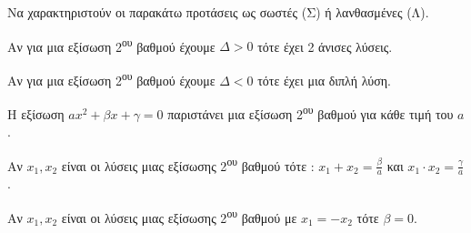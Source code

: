 Να χαρακτηριστούν οι παρακάτω προτάσεις ως σωστές (Σ) ή λανθασμένες (Λ).
\begin{alist}[leftmargin=4mm]
\item Αν για μια εξίσωση 2\textsuperscript{ου} βαθμού έχουμε $ \varDelta>0 $ τότε έχει 2 άνισες λύσεις.
\item Αν για μια εξίσωση 2\textsuperscript{ου} βαθμού έχουμε $ \varDelta<0 $ τότε έχει μια διπλή λύση.
\item Η εξίσωση $ ax^2+\beta x+\gamma=0 $ παριστάνει μια εξίσωση 2\textsuperscript{ου} βαθμού για κάθε τιμή του $ a $.
\item Αν $ x_1, x_2 $ είναι οι λύσεις μιας εξίσωσης 2\textsuperscript{ου} βαθμού τότε : $ x_1+x_2=\frac{\beta}{a} $ και $ x_1\cdot x_2=\frac{\gamma}{a} $.
\item Αν $ x_1, x_2 $ είναι οι λύσεις μιας εξίσωσης 2\textsuperscript{ου} βαθμού με $ x_1=-x_2 $ τότε $ \beta=0 $.
\end{alist}
